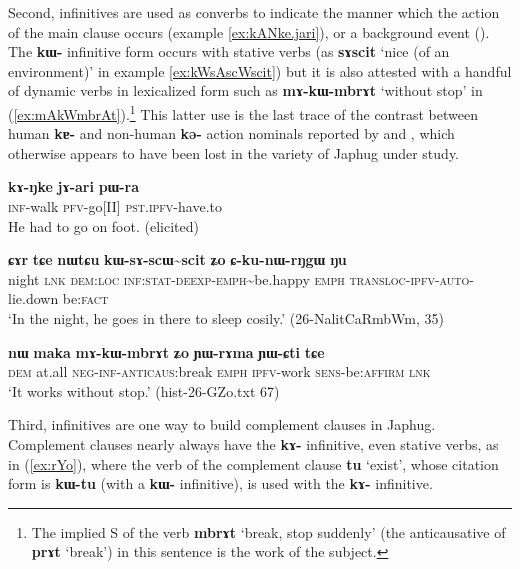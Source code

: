 \documentclass[oldfontcommands,oneside,a4paper,11pt]{article}
\newcommand{\ipa}[1]{\textbf{\phon#1}} %
\newcommand{\jpg}[2]{\ipa{#1} `#2'} %
\newcommand{\tld}{\textasciitilde{}}
\begin{document}
Second, infinitives are used as converbs to indicate the manner which the action of the main clause occurs (example \ref{ex:kANke.jari}), or a background event (\citealt{jacques14linking}). The \ipa{kɯ-} infinitive form occurs with stative verbs (as \jpg{sɤscit}{nice (of an environment)} in example \ref{ex:kWsAscWscit}) but it is also attested with a handful of dynamic verbs in lexicalized form such as \ipa{mɤ-kɯ-mbrɤt} `without stop' in (\ref{ex:mAkWmbrAt}).\footnote{The implied S of the verb \jpg{mbrɤt}{break, stop suddenly} (the anticausative of  \jpg{prɤt}{break}) in this sentence is the work of the subject.  } This latter use is the last trace of the contrast between human \ipa{kɐ-} and non-human \ipa{kə-} action nominals reported by \citet[476]{sun12complementation} and \citealt{jackson14morpho}, which otherwise appears to have been lost in the variety of Japhug under study.

\begin{exe}
\ex \label{ex:kANke.jari}
\gll
\ipa{kɤ-ŋke} 	\ipa{jɤ-ari} 	\ipa{pɯ-ra} \\
\textsc{inf}-walk \textsc{pfv}-go[II] \textsc{pst.ipfv}-have.to \\
\glt He had to go on foot. (elicited)
\end{exe}

\begin{exe}
\ex \label{ex:kWsAscWscit}
\gll
\ipa{ɕɤr} 	\ipa{tɕe} 	\ipa{nɯtɕu} 	\ipa{kɯ-sɤ-scɯ\tld{}scit} 	\ipa{ʑo} 	\ipa{ɕ-ku-nɯ-rŋgɯ} 	\ipa{ŋu} \\
night \textsc{lnk} \textsc{dem:loc} \textsc{inf:stat-deexp-emph}\tld{}be.happy \textsc{emph} \textsc{transloc-ipfv-auto}-lie.down be:\textsc{fact} \\
\glt `In the night, he goes in there to sleep cosily.' (26-NalitCaRmbWm, 35)
\end{exe}

\begin{exe}
\ex \label{ex:mAkWmbrAt}
\gll
 \ipa{nɯ} 	\ipa{maka} 	\ipa{mɤ-kɯ-mbrɤt} 	\ipa{ʑo} 	\ipa{ɲɯ-rɤma} 	\ipa{ɲɯ-ɕti} 	\ipa{tɕe} \\
 \textsc{dem} at.all \textsc{neg-inf-anticaus:}break \textsc{emph} \textsc{ipfv}-work \textsc{sens}-be:\textsc{affirm} \textsc{lnk} \\
\glt `It works without stop.' (hist-26-GZo.txt 67)
\end{exe}

Third, infinitives are one way to build complement clauses in Japhug. Complement clauses nearly always have the \ipa{kɤ-} infinitive, even stative verbs, as in (\ref{ex:rYo}), where the verb of the complement clause \jpg{tu}{exist}, whose citation form is \ipa{kɯ-tu} (with a \ipa{kɯ-} infinitive), is used with the \ipa{kɤ-} infinitive.
\end{document}
